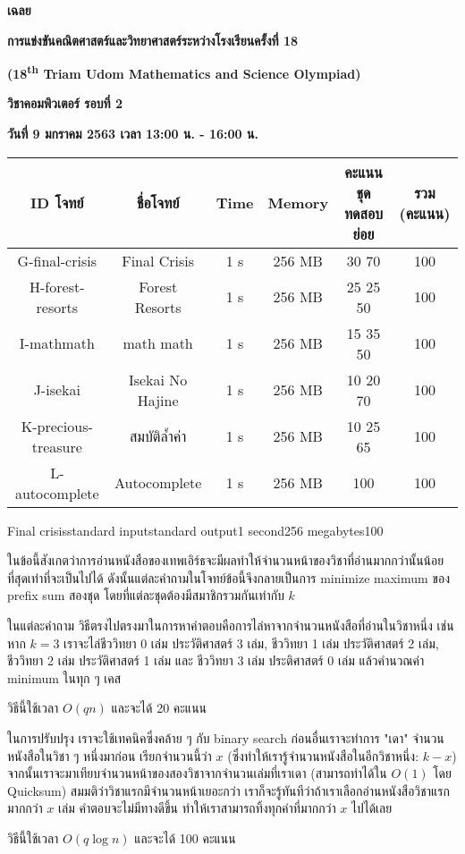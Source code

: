 \documentclass[11pt,a4paper]{article}
\begin{document}
\vspace*{\fill}%
\noindent
\begin{center}
{\Large \textbf{เฉลย}}

{\Large \textbf{การแข่งขันคณิตศาสตร์และวิทยาศาสตร์ระหว่างโรงเรียนครั้งที่ 18}}

{\Large \textbf{(18\textsuperscript{th} Triam Udom Mathematics and Science Olympiad)}} 

{\Large\textbf{วิชาคอมพิวเตอร์ รอบที่ 2}}

{\Large\textbf{วันที่ 9 มกราคม 2563 เวลา 13:00 น. - 16:00 น.}}

\begin{tabular}{ |c|c|c|c|c|c|  }
  \hline
  \textbf{ID โจทย์} & ชื่อโจทย์ & Time & Memory & คะแนนชุดทดสอบย่อย & รวม (คะแนน)\\
  \hline
  G-final-crisis & Final Crisis & 1 s & 256 MB & 30 70 & 100\\
  H-forest-resorts & Forest Resorts & 1 s & 256 MB & 25 25 50 & 100\\
  I-mathmath & math math & 1 s & 256 MB & 15 35 50 & 100\\
  J-isekai & Isekai No Hajine & 1 s & 256 MB & 10 20 70 & 100\\
  K-precious-treasure & สมบัติล้ำค่า & 1 s & 256 MB & 10 25 65 & 100\\
  L-autocomplete & Autocomplete & 1 s & 256 MB & 100 & 100\\
  \hline
\end{tabular}

\end{center}
\vfill
\pagebreak

\begin{problem}{Final crisis}{standard input}{standard output}{1 second}{256 megabytes}{100}

ในข้อนี้สังเกตว่าการอ่านหนังสือของเทพเอิร์ธจะมีผลทำให้จำนวนหน้าของวิชาที่อ่านมากกว่านั้นน้อยที่สุดเท่าที่จะเป็นไปได้ ดังนั้นแต่ละคำถามในโจทย์ข้อนี้จึงกลายเป็นการ minimize maximum ของ prefix sum สองชุด โดยที่แต่ละชุดต้องมีสมาชิกรวมกันเท่ากับ $k$

ในแต่ละคำถาม วิธีตรงไปตรงมาในการหาคำตอบคือการไล่หาจากจำนวนหนังสือที่อ่านในวิชาหนึ่ง เช่น หาก $k = 3$ เราจะไล่ชีววิทยา 0 เล่ม ประวัติศาสตร์ 3 เล่ม, ชีววิทยา 1 เล่ม ประวัติศาสตร์ 2 เล่ม, ชีววิทยา 2 เล่ม ประวัติศาสตร์ 1 เล่ม และ ชีววิทยา 3 เล่ม ประติศาสตร์ 0 เล่ม แล้วคำนวณค่า minimum ในทุก ๆ เคส 

วิธีนี้ใช้เวลา $O(qn)$ และจะได้ 20 คะแนน

ในการปรับปรุง เราจะใช้เทคนิคซึ่งคล้าย ๆ กับ binary search ก่อนอื่นเราจะทำการ "เดา" จำนวนหนังสือในวิชา ๆ หนึ่งมาก่อน เรียกจำนวนนี้ว่า $x$ (ซึ่งทำให้เรารู้จำนวนหนังสือในอีกวิชาหนึ่ง: $k-x$) จากนั้นเราจะมาเทียบจำนวนหน้าของสองวิชาจากจำนวนเล่มที่เราเดา (สามารถทำได้ใน $O(1)$ โดย Quicksum) สมมติว่าวิชาแรกมีจำนวนหน้าเยอะกว่า เราก็จะรู้ทันทีว่าถ้าเราเลือกอ่านหนังสือวิชาแรกมากกว่า $x$ เล่ม คำตอบจะไม่มีทางดีขึ้น ทำให้เราสามารถทิ้งทุกค่าที่มากกว่า $x$ ไปได้เลย

วิธีนี้ใช้เวลา $O(q \log n)$ และจะได้ 100 คะแนน
\end{problem}
\end{document}
